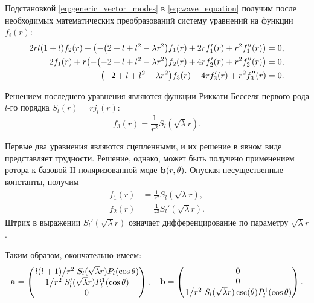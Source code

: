 \documentclass[12pt,a4paper]{article}
\begin{document}
        Подстановкой \autoref{eq:generic_vector_modes} в \autoref{eq:wave_equation} получим после необходимых математических преобразований систему уравнений на функции $f_i(r)$:
        \begin{equation}\begin{aligned}
            2 r l (1 + l) f_2(r) + \qty(
                - \qty(2 + l + l^2 - \lambda r^2) f_1(r) +
                2 r f_1'(r) + r^2 f_1''(r)
            ) &= 0, \\
            2 f_1(r) + r \qty(
                - \qty(-2 + l + l^2 - \lambda r^2) f_2(r) +
                4 r f_2'(r) + r^2 f_2''(r)
            ) &= 0, \\
            - \qty(-2 + l + l^2 - \lambda r^2) f_3(r) +
                4 r f_3'(r) + r^2 f_3''(r) &= 0.
        \end{aligned}\end{equation}

        Решением последнего уравнения являются функции Риккати-Бесселя первого рода $l$-го порядка $S_l(r) = r j_l(r)$:
        \begin{equation}
            f_3(r) = \frac{1}{r^2} S_l(\sqrt\lambda r).
        \end{equation}

        Первые два уравнения являются сцепленными, и их решение в явном виде представляет трудности. Решение, однако, может быть получено применением ротора к базовой $\mathrm{II}$-поляризованной моде $\vb{b}(r,\theta)$. Опуская несущественные константы, получим
        \begin{equation}\begin{aligned}
            f_1(r) &= \frac{1}{r^2} S_l(\sqrt\lambda r), \\
            f_2(r) &= \frac{1}{r^2} S_l'(\sqrt\lambda r) .
        \end{aligned}\end{equation}
        Штрих в выражении $S_l'(\sqrt\lambda r)$ означает дифференцирование по параметру $\sqrt\lambda r$.

        Таким образом, окончательно имеем:
        \begin{equation}
            \vb{a} = \begin{pmatrix}
                \flatfrac{l(l+1)}{r^2} S_l(\sqrt\lambda r) P_l(\cos\theta) \\
                \flatfrac{1}{r^2} S_l'(\sqrt\lambda r) P_l^1(\cos\theta) \\
                0
            \end{pmatrix} , \quad
            \vb{b} = \begin{pmatrix}
                0 \\
                0 \\
                \flatfrac{1}{r^2} S_l(\sqrt\lambda r) \csc(\theta) P_l^1(\cos\theta)
            \end{pmatrix} .
        \end{equation}
\end{document}
